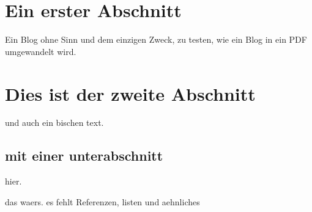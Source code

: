 \documentclass[a4paper,10pt]{scrbook}
\begin{document}
\hypertarget{ein-erster-abschnitt}{%
\section{Ein erster Abschnitt}\label{ein-erster-abschnitt}}

Ein Blog ohne Sinn und dem einzigen Zweck, zu testen, wie ein Blog in
ein PDF umgewandelt wird.

\hypertarget{dies-ist-der-zweite-abschnitt}{%
\section{Dies ist der zweite
Abschnitt}\label{dies-ist-der-zweite-abschnitt}}

und auch ein bischen text.

\hypertarget{mit-einer-unterabschnitt}{%
\subsection{mit einer unterabschnitt}\label{mit-einer-unterabschnitt}}

hier.

das waers. es fehlt Referenzen, listen und aehnliches


\printindex
\end{document}
